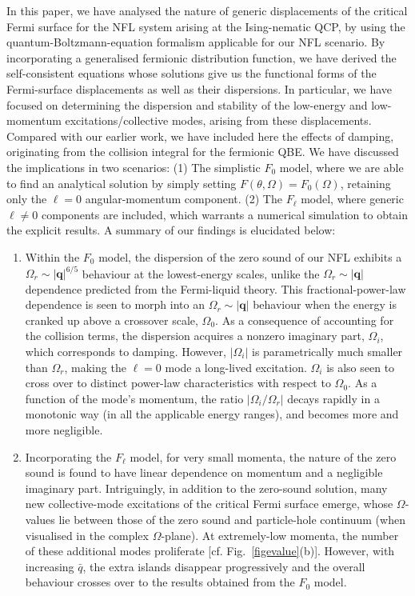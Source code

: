 \documentclass[aps, prb, onecolumn, nofootinbib, citeautoscript, 10pt]{revtex4-2}
\begin{document}
In this paper, we have analysed the nature of generic displacements of the critical Fermi surface for the NFL system arising at the Ising-nematic QCP, by using the quantum-Boltzmann-equation formalism applicable for our NFL scenario. By incorporating a generalised fermionic distribution function, we have derived the self-consistent equations whose solutions give us the functional forms of the Fermi-surface displacements as well as their dispersions. In particular, we have focused on determining the dispersion and stability of the low-energy and low-momentum excitations/collective modes, arising from these displacements. Compared with our earlier work, we have included here the effects of damping, originating from the collision integral for the fermionic QBE. We have discussed the implications in two scenarios: (1) The simplistic $F_0$ model, where we are able to find an analytical solution by simply setting $F(\theta,\Omega)=F_0(\Omega)$, retaining only the $\ell=0$ angular-momentum component. (2) The $F_\ell$ model, where generic $\ell\neq 0$ components are included, which warrants a numerical simulation to obtain the explicit results.  A summary of our findings is elucidated below:
\begin{enumerate}
	
\item Within the $F_0$ model, the dispersion of the zero sound of our NFL exhibits a $\Omega_r \sim |\mathbf q|^{6/5}$ behaviour at the lowest-energy scales, unlike the $\Omega_r \sim |\mathbf q|$ dependence predicted from the Fermi-liquid theory. This fractional-power-law dependence is seen to morph into an $ \Omega_r \sim |\mathbf q|$ behaviour when the energy is cranked up above a crossover scale, $\Omega_0$. As a consequence of accounting for the collision terms, the dispersion acquires a nonzero imaginary part, $\Omega_i $, which corresponds to damping. However, $|\Omega_i|$ is parametrically much smaller than $\Omega_r$, making the $\ell = 0$ mode a long-lived excitation. 
	$\Omega_i$ is also seen to cross over to distinct power-law characteristics with respect to $\Omega_0$.
	As a function of the mode's momentum, the ratio $|\Omega_i /\Omega_r |$ decays rapidly in a monotonic way (in all the applicable energy ranges), and becomes more and more negligible.
	
\item Incorporating the $F_\ell$ model, for very small momenta, the nature of the zero sound is found to have linear dependence on momentum and a negligible imaginary part. Intriguingly, in addition to the zero-sound solution, many new collective-mode excitations of the critical Fermi surface emerge, whose $\Omega $-values lie between those of the zero sound and particle-hole continuum (when visualised in the complex $\Omega$-plane). At extremely-low momenta, the number of these additional modes proliferate [cf. Fig.~\ref{figevalue}(b)]. However, with increasing $\bar q$, the extra islands disappear progressively and the overall behaviour crosses over to the results obtained from the $F_0$ model. 
	
\end{enumerate}  
\end{document}
